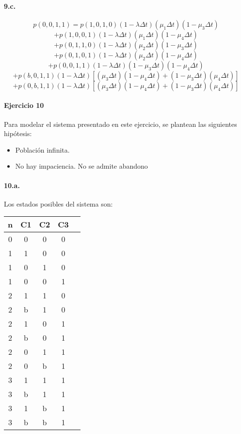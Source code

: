 \documentclass{article}
\begin{document}
   \paragraph{9.c.}
      $$p(0,0,1,1) = p(1,0,1,0) (1 - \lambda \Delta t) (\mu_1 \Delta t) (1 - \mu_3 \Delta t)$$
      $$           + p(1,0,0,1) (1 - \lambda \Delta t) (\mu_1 \Delta t) (1 - \mu_4 \Delta t)$$
      $$           + p(0,1,1,0) (1 - \lambda \Delta t) (\mu_2 \Delta t) (1 - \mu_3 \Delta t)$$
      $$           + p(0,1,0,1) (1 - \lambda \Delta t) (\mu_2 \Delta t) (1 - \mu_4 \Delta t)$$
      $$           + p(0,0,1,1) (1 - \lambda \Delta t) (1 - \mu_3 \Delta t) (1 - \mu_4 \Delta t)$$
      $$           + p(b,0,1,1) (1 - \lambda \Delta t) [(\mu_3 \Delta t) (1 - \mu_4 \Delta t) + (1 - \mu_3 \Delta t) (\mu_4 \Delta t)]$$
      $$           + p(0,b,1,1) (1 - \lambda \Delta t) [(\mu_3 \Delta t) (1 - \mu_4 \Delta t) + (1 - \mu_3 \Delta t) (\mu_4 \Delta t)]$$


\paragraph{Ejercicio 10}
   Para modelar el sistema presentado en este ejercicio, se plantean las siguientes hip\'otesis:

   \begin{itemize}
      \item Poblaci\'on infinita.
      \item No hay impaciencia. No se admite abandono
   \end{itemize}

   \paragraph{10.a.} Los estados posibles del sistema son:
   \begin{center}
   \begin{tabular}{|| c | c | c | c | c ||}
   \hline 
      n & C1 & C2 & C3 \\ \hline \hline
      0 & 0  & 0  & 0   \\ \hline \hline
      1 & 1  & 0  & 0    \\ \hline 
      1 & 0  & 1  & 0    \\ \hline
      1 & 0  & 0  & 1    \\ \hline \hline
      2 & 1  & 1  & 0   \\ \hline
      2 & b  & 1  & 0    \\ \hline
      2 & 1  & 0  & 1    \\ \hline
      2 & b  & 0  & 1    \\ \hline
      2 & 0  & 1  & 1    \\ \hline
      2 & 0  & b  & 1    \\ \hline \hline
      3 & 1  & 1  & 1    \\ \hline
      3 & b  & 1  & 1    \\ \hline
      3 & 1  & b  & 1    \\ \hline
      3 & b  & b  & 1    \\ \hline
   \end{tabular}
   \end{center}
\end{document}
